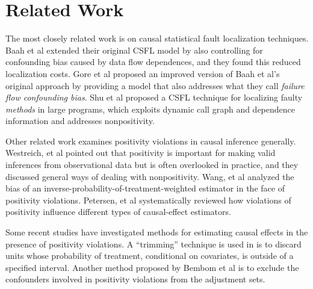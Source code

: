 \section{Related Work}
The most closely related work is on causal statistical fault localization techniques.  Baah et al \cite{baah2011mitigating} extended their original CSFL model by also controlling for confounding bias caused by data flow dependences, and they found this reduced localization costs.  Gore et al \cite{gore2012reducing} proposed an improved version of Baah et al’s original approach by providing a model that also addresses what they call {\it failure flow confounding bias}.  Shu et al \cite{shu2013mfl} proposed a CSFL technique for localizing faulty {\it methods} in large programs, which exploits dynamic call graph and dependence information and addresses nonpositivity.

Other related work examines positivity violations in causal inference generally.  Westreich, et al \cite{westreich2010invited} pointed out that positivity is important for making valid inferences from observational data but is often overlooked in practice, and they discussed general ways of dealing with nonpositivity.  Wang, et al \cite{wang2006diagnosing} analyzed the bias of an inverse-probability-of-treatment-weighted estimator in the face of positivity violations.  Petersen, et al \cite{petersen2010diagnosing} systematically reviewed how violations of positivity influence different types of causal-effect estimators.

Some recent studies have investigated methods for estimating causal effects in the presence of positivity violations. A ``trimming” technique is used in \cite{crump2006moving} is to discard units whose probability of treatment, conditional on covariates, is outside of a specified interval.  Another method proposed by Bembom et al  \cite{bembom2008data} is to exclude the confounders involved in positivity violations from the adjustment sets.  

